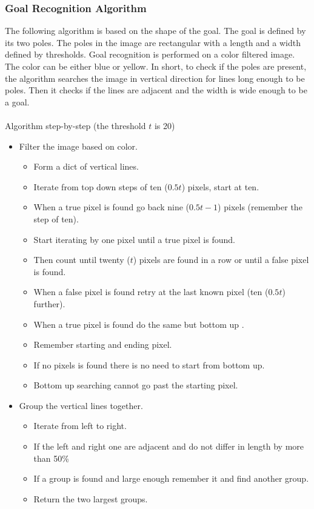 \documentclass[a4paper]{article}
\begin{document}
\subsubsection{Goal Recognition Algorithm}
\label{sec:goalrecognition}
The following algorithm is based on the shape of the goal. The goal is defined by its two poles. The poles in the image are rectangular with a length and a width defined by thresholds. Goal recognition is performed on a color filtered image. The color can be either blue or yellow. In short, to check if the poles are present, the algorithm searches the image in vertical direction for lines long enough to be poles. Then it checks if the lines are adjacent and the width is wide enough to be a goal.\\\\ 
Algorithm step-by-step (the threshold $t$ is 20)
\begin{itemize}
\item Filter the image based on color.
	\begin{itemize}
	\item Form a dict of vertical lines.
	\item Iterate from top down steps of ten ($0.5t$) pixels, start at ten.
	\item When a true pixel is found go back nine ($0.5t-1$) pixels (remember the step of ten).
	\item Start iterating by one pixel until a true pixel is found.
	\item Then count until twenty ($t$) pixels are found in a row or until a false pixel is found.
	\item When a false pixel is found retry at the last known pixel (ten ($0.5t$) further).
	\item When a true pixel is found do the same but bottom up .
	\item Remember starting and ending pixel.
	\item If no pixels is found there is no need to start from bottom up.
	\item Bottom up searching cannot go past the starting pixel.
	\end{itemize}
\item Group the vertical lines together.
	\begin{itemize}
	\item Iterate from left to right.
	\item If the left and right one are adjacent and do not differ in length by more than 50\%
	\item If a group is found and large enough remember it and find another group.
	\item Return the two largest groups.
	\end{itemize}
\end{itemize}
\end{document}
